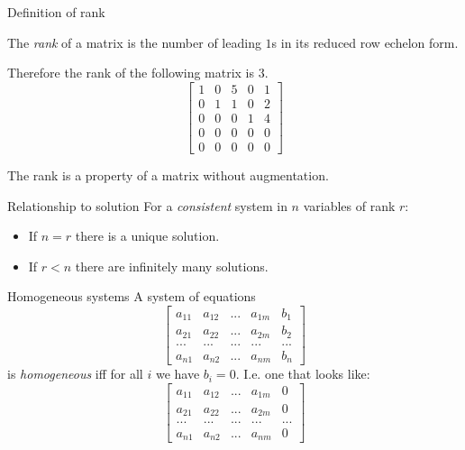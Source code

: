 \documentclass{beamer}
\begin{document}
\begin{frame}{Definition of rank}
  \begin{definition}
    The \emph{rank} of a matrix is the number of leading $1$s in its reduced row echelon form.
  \end{definition}
  \begin{example}
    Therefore the rank of the following matrix is $3$.
    \begin{equation*}
      \left[\begin{array}{rrrrr}
              1 & 0 & 5 & 0 & 1  \\
              0 & 1 & 1 & 0 & 2  \\
              0 & 0 & 0 & 1 & 4 \\
              0 & 0 & 0 & 0 & 0 \\
              0 & 0 & 0 & 0 & 0 
            \end{array}\right] 
        \end{equation*}
      \end{example}
      The rank is a property of a matrix without augmentation.
\end{frame}

\begin{frame}{Relationship to solution}
  For a \emph{consistent} system in $n$ variables of rank $r$:
  \begin{itemize}
  \item If $n=r$ there is a unique solution.
  \item If $r<n$ there are infinitely many solutions.
  \end{itemize}
\end{frame}

\begin{frame}{Homogeneous systems}
  A system of equations
  \begin{equation*}
      \left[
        \begin{array}{rrrr|r}
          a_{11} & a_{12} & ... & a_{1m} & b_1\\
          a_{21} & a_{22} & ... & a_{2m} & b_2\\
          ... & ... & ... & ... & ...\\
          a_{n1} & a_{n2} & ... & a_{nm} & b_n
        \end{array}
      \right] 
    \end{equation*}
    is \emph{homogeneous} iff for all $i$ we have $b_i = 0$.
    I.e. one that looks like:
    \begin{equation*}
      \left[
        \begin{array}{rrrr|r}
          a_{11} & a_{12} & ... & a_{1m} & 0\\
          a_{21} & a_{22} & ... & a_{2m} & 0\\
          ... & ... & ... & ... & ...\\
          a_{n1} & a_{n2} & ... & a_{nm} & 0
        \end{array}
      \right] 
    \end{equation*}
\end{frame}
\end{document}
